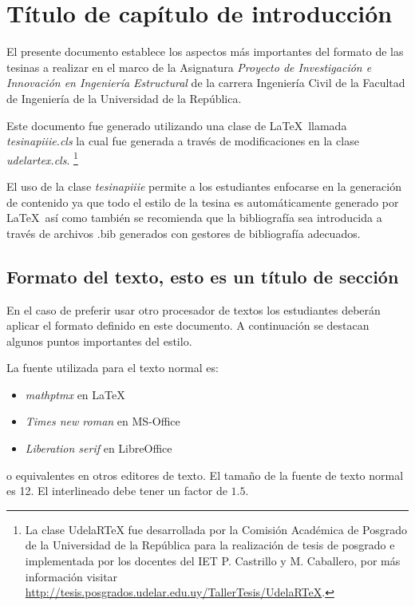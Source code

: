 \chapter{Título de capítulo de introducción}

El presente documento establece los aspectos más importantes del formato de las tesinas a realizar en el marco de la Asignatura \textit{Proyecto de Investigación e Innovación en Ingeniería Estructural} de la carrera Ingeniería Civil de la Facultad de Ingeniería de la Universidad de la República. %

Este documento fue generado utilizando una clase de \LaTeX \, llamada \textit{tesinapiiie.cls} la cual fue generada a través de modificaciones en la clase \textit{udelartex.cls}. \footnote{La clase UdelaRTeX fue desarrollada por la Comisión Académica de Posgrado de la Universidad de la República para la realización de tesis de posgrado e implementada por los docentes del IET P. Castrillo y M. Caballero, por más información visitar \url{http://tesis.posgrados.udelar.edu.uy/TallerTesis/UdelaRTeX}.}

El uso de la clase \textit{tesinapiiie} permite a los estudiantes enfocarse en la generación de contenido ya que todo el estilo de la tesina es automáticamente generado por \LaTeX \, así como también se recomienda que la bibliografía sea introducida a través de archivos .bib generados con gestores de bibliografía adecuados. %



\section{Formato del texto, esto es un título de sección}

En el caso de preferir usar otro procesador de textos los estudiantes deberán aplicar el formato definido en este documento. %
%
A continuación se destacan algunos puntos importantes del estilo.

La fuente utilizada para el texto normal es:
\begin{itemize}
	\item \textit{mathptmx} en \LaTeX 
	\item \textit{Times new roman} en MS-Office
	\item \textit{Liberation serif} en LibreOffice
\end{itemize}
%
o equivalentes en otros editores de texto. %
El tamaño de la fuente de texto normal es 12. %
%
El interlineado debe tener un factor de $1.5$. %

